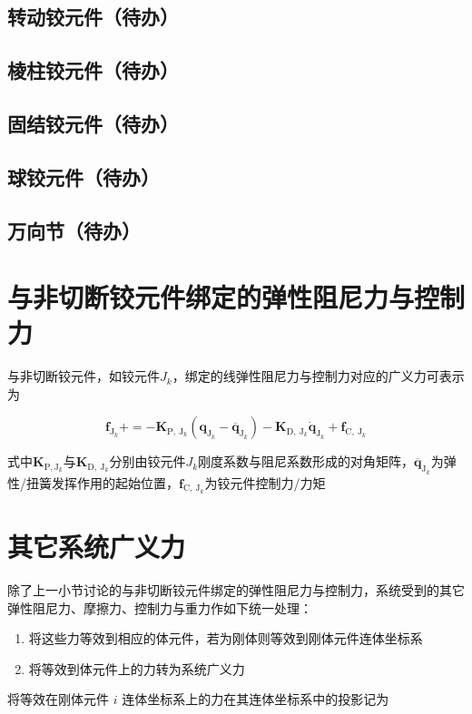 \subsection{转动铰元件（待办）}
\subsection{棱柱铰元件（待办）}
\subsection{固结铰元件（待办）}
\subsection{球铰元件（待办）}
\subsection{万向节（待办）}
\section{与非切断铰元件绑定的弹性阻尼力与控制力}
与非切断铰元件，如铰元件$J_{k}$，绑定的线弹性阻尼力与控制力对应的广义力可表示为

\[
\boldsymbol{f}_{\mathrm{J}_{k}}+=-\boldsymbol{K}_{\mathrm{P}, \mathrm{~J}_{k}}\left(\boldsymbol{q}_{\mathrm{J}_{k}}-\overline{\boldsymbol{q}}_{\mathrm{J}_{k}}\right)-\boldsymbol{K}_{\mathrm{D}, \mathrm{~J}_{k}} \dot{\boldsymbol{q}}_{\mathrm{J}_{k}}+\boldsymbol{f}_{\mathrm{C}, \mathrm{~J}_{k}}
\]

式中$\boldsymbol{K}_{\mathrm{P}, \mathrm{J}_{k}}$与$\boldsymbol{K}_{\mathrm{D}, \mathrm{~J}_{k}}$分别由铰元件$J_{k}$刚度系数与阻尼系数形成的对角矩阵，$\overline{\boldsymbol{q}}_{\mathrm{J}_{k}}$为弹性/扭簧发挥作用的起始位置，$\boldsymbol{f}_{\mathrm{C}, \mathrm{~J}_{k}}$为铰元件控制力/力矩
\section{其它系统广义力}
除了上一小节讨论的与非切断铰元件绑定的弹性阻尼力与控制力，系统受到的其它弹性阻尼力、摩擦力、控制力与重力作如下统一处理：

\begin{enumerate}

\item 将这些力等效到相应的体元件，若为刚体则等效到刚体元件连体坐标系

\item 将等效到体元件上的力转为系统广义力

\end{enumerate}
将等效在刚体元件 $i$ 连体坐标系上的力在其连体坐标系中的投影记为

